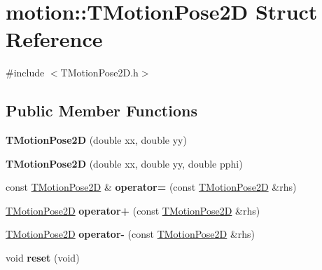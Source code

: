 \hypertarget{structmotion_1_1TMotionPose2D}{}\section{motion\+:\+:T\+Motion\+Pose2D Struct Reference}
\label{structmotion_1_1TMotionPose2D}


{\ttfamily \#include $<$T\+Motion\+Pose2\+D.\+h$>$}

\subsection*{Public Member Functions}
\begin{DoxyCompactItemize}
\item 
\mbox{\label{structmotion_1_1TMotionPose2D_a26e593552ace4052d69d05ac07553e32}} 
{\bfseries T\+Motion\+Pose2D} (double xx, double yy)
\item 
\mbox{\label{structmotion_1_1TMotionPose2D_a95c04345793f02fbc32792a9739d754d}} 
{\bfseries T\+Motion\+Pose2D} (double xx, double yy, double pphi)
\item 
\mbox{\label{structmotion_1_1TMotionPose2D_ae2879a58d5ba238d4137a049170cda83}} 
const \mbox{\hyperlink{structmotion_1_1TMotionPose2D}{T\+Motion\+Pose2D}} \& {\bfseries operator=} (const \mbox{\hyperlink{structmotion_1_1TMotionPose2D}{T\+Motion\+Pose2D}} \&rhs)
\item 
\mbox{\label{structmotion_1_1TMotionPose2D_ac678e92a153d2f21f2967846ce2a128e}} 
\mbox{\hyperlink{structmotion_1_1TMotionPose2D}{T\+Motion\+Pose2D}} {\bfseries operator+} (const \mbox{\hyperlink{structmotion_1_1TMotionPose2D}{T\+Motion\+Pose2D}} \&rhs)
\item 
\mbox{\label{structmotion_1_1TMotionPose2D_ada5c57be32bc815786bbd377e4db8b1d}} 
\mbox{\hyperlink{structmotion_1_1TMotionPose2D}{T\+Motion\+Pose2D}} {\bfseries operator-\/} (const \mbox{\hyperlink{structmotion_1_1TMotionPose2D}{T\+Motion\+Pose2D}} \&rhs)
\item 
\mbox{\label{structmotion_1_1TMotionPose2D_a528b2418d8a4ebcbc5c8e3e0d160b66a}} 
void {\bfseries reset} (void)
\end{DoxyCompactItemize}
